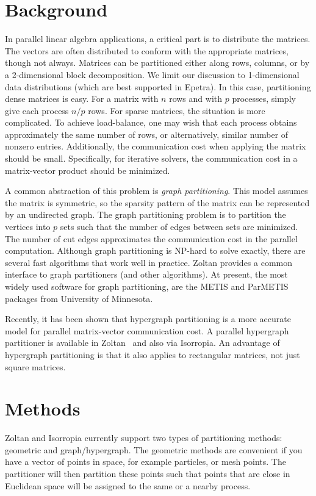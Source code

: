 \section{Background}
In parallel linear algebra applications, a critical part is to 
distribute the matrices. The vectors are often distributed to conform
with the appropriate matrices, though not always. Matrices can
be partitioned either along rows, columns, or by a 2-dimensional
block decomposition. We limit our discussion to 1-dimensional data
distributions (which are best supported in Epetra). In this case, 
partitioning dense matrices is easy.
For a matrix with $n$ rows and with $p$ processes, simply give
each process $n/p$  rows. For sparse matrices, the situation
is more complicated. To achieve load-balance, one may wish 
that each process obtains approximately the same number of rows,
or alternatively, similar number of nonzero entries. 
Additionally, the communication cost when applying the matrix
should be small. Specifically, for iterative solvers, the
communication cost in a matrix-vector product should be minimized.

A common abstraction of this problem is \emph{graph partitioning}.
This model assumes the matrix is symmetric, so the sparsity 
pattern of the matrix can be represented by an undirected graph.
The graph partitioning problem is to partition the
vertices into $p$ sets such that the number of edges between
sets are minimized. The number of cut edges approximates the
communication cost in the parallel computation. Although 
graph partitioning is NP-hard to solve exactly, there are
several fast algorithms that work well in practice. Zoltan
provides a common interface to graph partitioners (and other algorithms).
At present, the most widely used software for graph partitioning,
are the METIS and ParMETIS \cite{Metis,KarypisK99} packages from University 
of Minnesota.

Recently, it has been shown \cite{CatAyk99} that hypergraph partitioning 
is a more accurate model for parallel matrix-vector communication cost.
A parallel hypergraph partitioner is available in Zoltan~\cite{Zoltan-hypergraph} and also via Isorropia.
An advantage of hypergraph partitioning is that it
also applies to rectangular matrices, not just square matrices.

\section{Methods}
\label{sec:methods}
Zoltan and Isorropia currently support two types of partitioning methods: geometric and graph/hypergraph. The geometric methods are convenient if you have a vector of points in space, for example particles, or mesh points. The partitioner will then partition these points such that points that are close in Euclidean space will be assigned to the same or a nearby process. 

